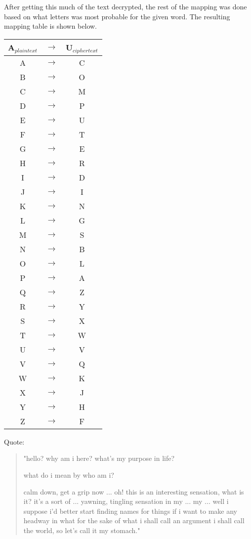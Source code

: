 After getting this much of the text decrypted, the rest of the mapping was done based on what letters was most probable for the given word. 
The resulting mapping table is shown below.
\begin{center}
	\begin{tabular}{ | c | c | c | } \hline 
		A$_{plaintext}$ & $\rightarrow$ & U$_{ciphertext}$ \\ \hline 
		A & $\rightarrow$ & C \\ \hline 
		B & $\rightarrow$ & O \\ \hline 
		C & $\rightarrow$ & M \\ \hline 
		D & $\rightarrow$ & P \\ \hline 
		E & $\rightarrow$ & U \\ \hline 
		F & $\rightarrow$ & T \\ \hline 
		G & $\rightarrow$ & E \\ \hline 
		H & $\rightarrow$ & R \\ \hline 
		I & $\rightarrow$ & D \\ \hline
		J & $\rightarrow$ & I \\ \hline 
		K & $\rightarrow$ & N \\ \hline 
		L & $\rightarrow$ & G \\ \hline 
		M & $\rightarrow$ & S \\ \hline 
		N & $\rightarrow$ & B \\ \hline 
		O & $\rightarrow$ & L \\ \hline 
		P & $\rightarrow$ & A \\ \hline 
		Q & $\rightarrow$ & Z \\ \hline 
		R & $\rightarrow$ & Y \\ \hline 
		S & $\rightarrow$ & X \\ \hline 
		T & $\rightarrow$ & W \\ \hline 
		U & $\rightarrow$ & V \\ \hline 
		V & $\rightarrow$ & Q \\ \hline 
		W & $\rightarrow$ & K \\ \hline 
		X & $\rightarrow$ & J \\ \hline 
		Y & $\rightarrow$ & H \\ \hline 
		Z & $\rightarrow$ & F \\ \hline 
	\end{tabular}
\end{center}

Quote:
\begin{quote} 
"hello?
why am i here? what's my purpose in life?

what do i mean by who am i?

calm down, get  a  grip  now  ...  oh!  this  is  an  interesting
sensation,  what  is  it?  it's  a  sort of ... yawning, tingling
sensation in my ... my  ...  well  i  suppose  i'd  better  start
finding  names  for  things if i want to make any headway in what
for the sake of what i shall call an argument i  shall  call  the
world, so let's call it my stomach."
\end{quote}

